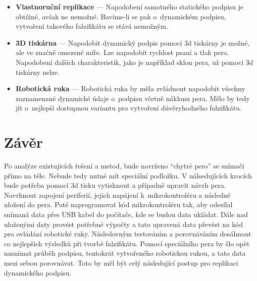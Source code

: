 \begin{itemize}
  \item \textbf{Vlastnoruční replikace} --- 
  Napodobení samotného statického podpisu je obtížné, avšak ne nemožné. 
  Bavíme-li se pak o~dynamickém podpisu, vytvoření takového falzifikátu se stává nemožným.

  \item \textbf{3D tiskárna} ---
  Napodobit dynamický podpis pomocí 3d tiskárny je možné, ale ve značně omezené míře.
  Lze napodobit rychlost psaní a tlak pera. 
  Napodobení dalších charakteristik, jako je například sklon pera, už pomocí 3d tiskárny nelze.

  \item \textbf{Robotická ruka} ---
  Robotická ruka by měla zvládnout napodobit všechny zaznamenané dynamické údaje o~podpisu včetně náklonu pera.
  Mělo by tedy jít o~nejlepší dostupnou variantu pro vytvoření důvěryhodného falzifikátu. 
\end{itemize}

\chapter{Závěr}
Po analýze existujících řešení a metod, bude navrženo ``chytré pero'' se snímači přímo na těle. Nebude tedy nutné mít speciální podložku.
V nálsedujících krocích bude potřeba pomocí 3d tisku vytisknout a případně upravit návrh pera.
Navrhnout zapojení periferií, jejich napájení k~mikrokontroléru a následné uložení do pera.
Poté naprogramovat kód mikrokontroléru tak, aby odesílal snímaná data přes USB kabel do počítače, kde se budou data ukládat.
Dále nad uloženými daty provést potřebné výpočty a tato upravená data převést na kód pro ovládání robotické ruky.
Následovným testováním a porovnáváním dosáhnout co nejlepších výsledků při tvorbě falzifikátu.
Pomocí speciálního pera by šlo opět nasnímat průběh podpisu, tentokrát vytvořeného robotickou rukou, a tato data mezi sebou porovnávat.
Toto by měl být celý následující postup pro replikaci dynamického podpisu.



